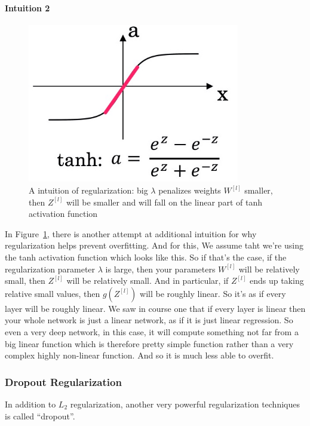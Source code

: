 \documentclass[UTF8]{article}
\newcommand{\Matrix}[1]{\boldsymbol{\mathit{#1}}}   %
\begin{document}
\paragraph{Intuition 2}
\begin{figure}[htb]
    \centering
    \includegraphics[width=25em]{figures/regularization-intuition-2}
    \caption{A intuition of regularization: big $\lambda$ penalizes weights $\Matrix{W}^{[l]}$
    smaller, then $\Matrix{Z}^{[l]}$ will be smaller and will fall on the linear part of tanh
    activation function}
    \label{fig:regularization-intuition-2}
\end{figure}

In Figure~\ref{fig:regularization-intuition-2}, there is another attempt at additional intuition
for why regularization helps prevent overfitting. And for this, We assume taht we're using the tanh
activation function which looks like this. So if that's the case, if the regularization parameter
$\lambda$ is large, then your parameters $\Matrix{W}^{[l]}$ will be relatively small, then
$\Matrix{Z}^{[l]}$ will be relatively small. And in particular, if $\Matrix{Z}^{[l]}$ ends up
taking relative small values, then $g(\Matrix{Z}^{[l]})$ will be roughly linear. So it's as if
every layer will be roughly linear. We saw in course one that if every layer is linear then your
whole network is just a linear network, as if it is just linear regression. So even a very deep
network, in this case, it will compute something not far from a big linear function which is
therefore pretty simple function rather than a very complex highly non-linear function. And so it
is much less able to overfit.

\subsubsection{Dropout Regularization}
In addition to $L_2$ regularization, another very powerful regularization techniques is called
``dropout''.
\end{document}
